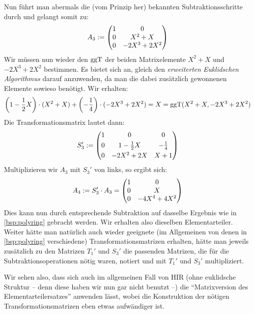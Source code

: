 \begin{thBeisp}
    Nun führt man abermals die (vom Prinzip her) bekannten Subtraktionsschritte
    durch und gelangt somit zu:
    \[ A_3 := \begin{pmatrix}   1 & 0     \\
                        0 & X^2+X \\
                        0 & -2X^3+2X^2  \end{pmatrix}   \]
    Wir müssen nun wieder den $\mathrm{ggT}$ der beiden Matrixelemente $X^2+X$ und
    $-2X^3+2X^2$ bestimmen. Es bietet sich an, gleich den \emph{erweiterten
    Euklidschen Algorithmus} darauf anzuwenden, da man die dabei zusätzlich
    gewonnenen Elemente sowieso benötigt. Wir erhalten:
    \[ \left( 1-\frac{1}{2}X \right) \cdot (X^2+X) + \left( -\frac{1}{4} \right)
        \cdot (-2X^3+2X^2) = X = \mathrm{ggT}(X^2+X,-2X^3+2X^2) \]
    Die Transformationsmatrix lautet dann:
    \[ S_3' := \begin{pmatrix}  1 & 0 & 0                           \\[3pt]
                        0 & 1-\frac{1}{2}X  & -\frac{1}{4}  \\[3pt]
                        0 & -2X^2+2X        & X+1                \end{pmatrix}   \]
    Multiplizieren wir $A_3$ mit $S_3'$ von links, so ergibt sich:
    \[ A_4 := S_3' \cdot A_3 
        = \begin{pmatrix}   1   &   0   \\
                    0   &   X   \\
                    0   & -4X^4+4X^2     \end{pmatrix}       \]
    Dies kann nun durch entsprechende Subtraktion auf dasselbe Ergebnis wie in
    \cref{bsp:polyring} gebracht werden. Wir erhalten also dieselben
    Elementarteiler. Weiter hätte man natürlich auch wieder geeignete
    (im Allgemeinen von denen in \cref{bsp:polyring} verschiedene)
    Transformationsmatrizen erhalten, hätte man jeweils zusätzlich zu den
    Matrizen $T_1'$ und $S_3'$ die passenden Matrizen, die für die
    Subtraktionsoperationen nötig waren, notiert und mit $T_1'$ und $S_3'$
    multipliziert.

    Wir sehen also, dass sich auch im allgemeinen Fall von HIR (ohne euklidsche
    Struktur -- denn diese haben wir nun gar nicht benutzt --) die
    \enquote{Matrixversion des Elementarteilersatzes} anwenden lässt, wobei die
    Konstruktion der nötigen Transformationsmatrizen eben etwas aufwändiger ist.
\end{thBeisp}












